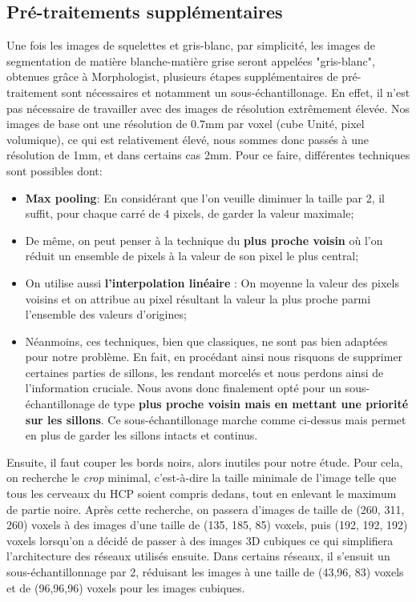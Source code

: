 \documentclass[12pt, oneside, a4paper, titlepage]{article}
\begin{document}
\subsection{Pré-traitements supplémentaires}
Une fois les images de squelettes et gris-blanc, par simplicité, les images de segmentation de matière blanche-matière grise seront appelées "gris-blanc", obtenues grâce à Morphologist, plusieurs étapes supplémentaires de pré-traitement sont nécessaires et notamment un sous-échantillonage. En effet, il n'est pas nécessaire de travailler avec des images de résolution extrêmement élevée. Nos images de base ont une résolution de 0.7mm par voxel (cube Unité, pixel volumique), ce qui est relativement élevé, nous sommes donc passés à une résolution de 1mm, et dans certains cas 2mm. Pour ce faire, différentes techniques sont possibles dont: 
\begin{itemize}
\item \textbf{Max pooling}: En considérant que l'on veuille diminuer la taille par 2, il suffit, pour chaque carré de 4 pixels, de garder la valeur maximale;
\item De même, on peut penser à la technique du \textbf{plus proche voisin} où l'on réduit un ensemble de pixels à la valeur de son pixel le plus central;
\item On utilise aussi \textbf{l'interpolation linéaire} : On moyenne la valeur des pixels voisins et on attribue au pixel résultant la valeur la plus proche parmi l'ensemble des valeurs d'origines;

\item Néanmoins, ces techniques, bien que classiques, ne sont pas bien adaptées pour notre problème. En fait, en procédant ainsi nous risquons de supprimer certaines parties de sillons, les rendant morcelés et nous perdons ainsi de l'information cruciale. Nous avons donc finalement opté pour un sous-échantillonage de type \textbf{plus proche voisin mais en mettant une priorité sur les sillons}. Ce sous-échantillonage marche comme ci-dessus mais permet en plus de garder les sillons intacts et continus.
\end{itemize}

Ensuite, il faut couper les bords noirs, alors inutiles pour notre étude. Pour cela, on recherche le \textit{crop} minimal, c'est-à-dire la taille minimale de l'image telle que tous les cerveaux du HCP soient compris dedans, tout en enlevant le maximum de partie noire. Après cette recherche, on passera d'images de taille de (260, 311, 260) voxels à des images d'une taille de (135, 185, 85) voxels, puis (192, 192, 192) voxels lorsqu'on a décidé de passer à des images 3D cubiques ce qui simplifiera l'architecture des réseaux utilisés ensuite. Dans certains réseaux, il s'ensuit un sous-échantillonnage par 2, réduisant les images à une taille de (43,96, 83) voxels et de (96,96,96) voxels pour les images cubiques. \\
\end{document}
